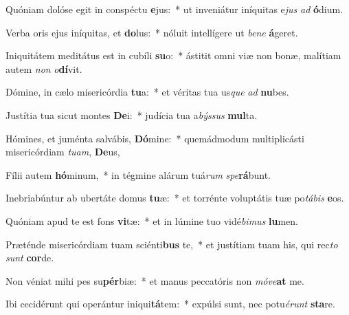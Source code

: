\item Quóniam dolóse egit in conspéctu \textbf{e}jus:~* ut inveniátur iníquitas e\textit{jus} \textit{ad} \textbf{ó}dium.
\item Verba oris ejus iníquitas, et \textbf{do}lus:~* nóluit intellígere ut \textit{be}\textit{ne} \textbf{á}geret.
\item Iniquitátem meditátus est in cubíli \textbf{su}o:~* ástitit omni viæ non bonæ, malítiam autem \textit{non} \textit{o}\textbf{dí}vit.
\item Dómine, in cælo misericórdia \textbf{tu}a:~* et véritas tua us\textit{que} \textit{ad} \textbf{nu}bes.
\item Justítia tua sicut montes \textbf{De}i:~* judícia tua a\textit{býs}\textit{sus} \textbf{mul}ta.
\item Hómines, et juménta salvábis, \textbf{Dó}mine:~* quemádmodum multiplicásti misericórdiam \textit{tu}\textit{am}, \textbf{De}us,
\item Fílii autem \textbf{hó}minum,~* in tégmine alárum tuá\textit{rum} \textit{spe}\textbf{rá}bunt.
\item Inebriabúntur ab ubertáte domus \textbf{tu}æ:~* et torrénte voluptátis tuæ po\textit{tá}\textit{bis} \textbf{e}os.
\item Quóniam apud te est fons \textbf{vi}tæ:~* et in lúmine tuo vidé\textit{bi}\textit{mus} \textbf{lu}men.
\item Præténde misericórdiam tuam sciénti\textbf{bus} te,~* et justítiam tuam his, qui rec\textit{to} \textit{sunt} \textbf{cor}de.
\item Non véniat mihi pes su\textbf{pér}biæ:~* et manus peccatóris non \textit{mó}\textit{ve}\textbf{at} me.
\item Ibi cecidérunt qui operántur iniqui\textbf{tá}tem:~* expúlsi sunt, nec potu\textit{é}\textit{runt} \textbf{sta}re.
